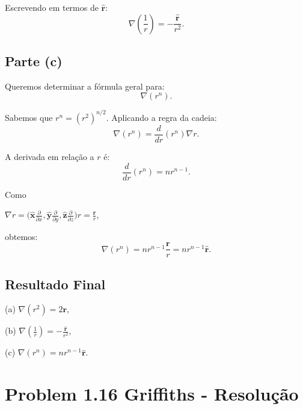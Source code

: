 \documentclass[a4paper,12pt]{article}
\begin{document}
Escrevendo em termos de \(\hat{\mathbf{r}}\):
\begin{equation}
\nabla \left(\frac{1}{r}\right) = -\frac{\hat{\mathbf{r}}}{r^2}.
\end{equation}

\subsection*{Parte (c)}

Queremos determinar a fórmula geral para:
\begin{equation}
\nabla (r^n).
\end{equation}

Sabemos que \(r^n = (r^2)^{n/2}\). Aplicando a regra da cadeia:
\begin{equation}
\nabla (r^n) = \frac{d}{dr}(r^n) \nabla r.
\end{equation}

A derivada em relação a \(r\) é:
\begin{equation}
\frac{d}{dr}(r^n) = n r^{n-1}.
\end{equation}

Como 

\(\nabla r = \Big(\hat{\mathbf{x}}\frac{\partial}{\partial x}, \hat{\mathbf{y}}\frac{\partial}{\partial y}, \hat{\mathbf{z}}\frac{\partial }{\partial z} \Big) r  = \frac{\mathbf{r}}{r}\), 


obtemos:
\begin{equation}
\nabla (r^n) = n r^{n-1} \frac{\mathbf{r}}{r} = n r^{n-1} \hat{\mathbf{r}}.
\end{equation}

\subsection*{Resultado Final}

(a) \(\nabla (r^2) = 2\mathbf{r}\),

(b) \(\nabla \left(\frac{1}{r}\right) = -\frac{\hat{\mathbf{r}}}{r^2}\),

(c) \(\nabla (r^n) = n r^{n-1} \hat{\mathbf{r}}\).


\section*{Problem 1.16 Griffiths - Resolu\c{c}\~ao}
\end{document}
